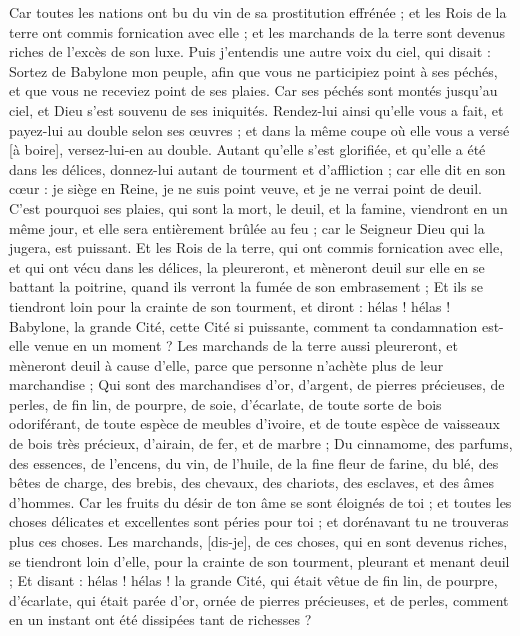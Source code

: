 \begin{multicols}{2}
Car toutes les nations ont bu du vin de sa prostitution effrénée ; et les Rois de la terre ont commis fornication avec elle ; et les marchands de la terre sont devenus riches de l'excès de son luxe.
Puis j'entendis une autre voix du ciel, qui disait : Sortez de Babylone mon peuple, afin que vous ne participiez point à ses péchés, et que vous ne receviez point de ses plaies.
Car ses péchés sont montés jusqu'au ciel, et Dieu s'est souvenu de ses iniquités.
Rendez-lui ainsi qu'elle vous a fait, et payez-lui au double selon ses œuvres ; et dans la même coupe où elle vous a versé [à boire], versez-lui-en au double.
Autant qu'elle s'est glorifiée, et qu'elle a été dans les délices, donnez-lui autant de tourment et d'affliction ; car elle dit en son cœur : je siège en Reine, je ne suis point veuve, et je ne verrai point de deuil.
C'est pourquoi ses plaies, qui sont la mort, le deuil, et la famine, viendront en un même jour, et elle sera entièrement brûlée au feu ; car le Seigneur Dieu qui la jugera, est puissant.
Et les Rois de la terre, qui ont commis fornication avec elle, et qui ont vécu dans les délices, la pleureront, et mèneront deuil sur elle en se battant la poitrine, quand ils verront la fumée de son embrasement ;
Et ils se tiendront loin pour la crainte de son tourment, et diront : hélas ! hélas ! Babylone, la grande Cité, cette Cité si puissante, comment ta condamnation est-elle venue en un moment ?
Les marchands de la terre aussi pleureront, et mèneront deuil à cause d'elle, parce que personne n'achète plus de leur marchandise ;
Qui sont des marchandises d'or, d'argent, de pierres précieuses, de perles, de fin lin, de pourpre, de soie, d'écarlate, de toute sorte de bois odoriférant, de toute espèce de meubles d'ivoire, et de toute espèce de vaisseaux de bois très précieux, d'airain, de fer, et de marbre ;
Du cinnamome, des parfums, des essences, de l'encens, du vin, de l'huile, de la fine fleur de farine, du blé, des bêtes de charge, des brebis, des chevaux, des chariots, des esclaves, et des âmes d'hommes.
Car les fruits du désir de ton âme se sont éloignés de toi ; et toutes les choses délicates et excellentes sont péries pour toi ; et dorénavant tu ne trouveras plus ces choses.
Les marchands, [dis-je], de ces choses, qui en sont devenus riches, se tiendront loin d'elle, pour la crainte de son tourment, pleurant et menant deuil ;
Et disant : hélas ! hélas ! la grande Cité, qui était vêtue de fin lin, de pourpre, d'écarlate, qui était parée d'or, ornée de pierres précieuses, et de perles, comment en un instant ont été dissipées tant de richesses ?

\end{multicols}
